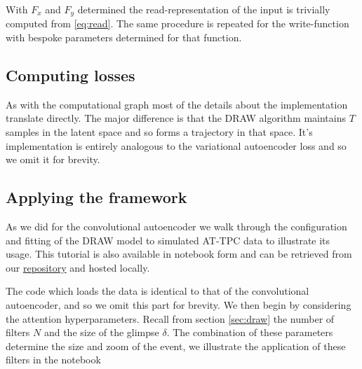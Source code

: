 With $F_x$ and $F_y$ determined the read-representation of the input is trivially computed from \ref{eq:read}. The same procedure is repeated for the write-function with bespoke parameters determined for that function.

\subsection{Computing losses}

As with the computational graph most of the details about the implementation translate directly. The major difference is that the DRAW algorithm maintains $T$ samples in the latent space and so forms a trajectory in that space. It's implementation is entirely analogous to the variational autoencoder loss and so we omit it for brevity. 

\subsection{Applying the framework}

As we did for the convolutional autoencoder we walk through the configuration and fitting of the DRAW model to simulated AT-TPC data to illustrate its usage. This tutorial is also available in notebook form and can be retrieved  from our \href{https://GitHub.com/AkTTPC/VAE-event-classification/blob/master/notebooks/simulated_draw_tutorial.ipynb}{repository} and hosted locally.

The code which loads the data is identical to that of the convolutional autoencoder, and so we omit this part for brevity. We then begin by considering the attention hyperparameters. Recall from section \ref{sec:draw} the number of filters $N$ and the size of the glimpse $\delta$. The combination of these parameters determine the size and zoom of the event, we illustrate the application of these filters in the notebook 

